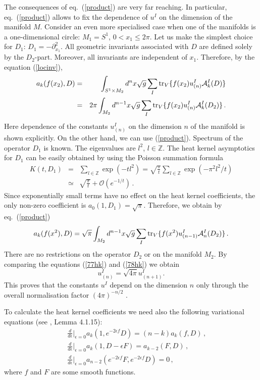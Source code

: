 The consequences of eq.\ (\ref{product})
are very far reaching. In particular, eq.\ (\ref{product}) allows to fix
the dependence of $u^I$ on the dimension of the manifold $M$.
Consider an even more specialised case when
one of the manifolds is a one-dimensional circle:  $M_1=S^1$, $0<x_1\le 2\pi$.
Let us make the simplest choice for $D_1$: 
$D_1=-\partial_{x_1}^2$. All geometric invariants associated with
$D$ are defined solely by the $D_2$-part. Moreover, all invariants are
independent of $x_1$.
Therefore, by the equation (\ref{locinv}),
\begin{eqnarray}
a_k(f(x_2),D)&=&\int_{S^1\times M_2}d^nx\sqrt{g}\sum_I
{\rm tr}_V \{f(x_2) u^I_{(n)} 
\mathcal{ A}^I_k (D) \} \nonumber \\
&=&2\pi\int_{M_2}d^{n-1}x\sqrt{g}\sum_I
{\rm tr}_V \{f(x_2) u^I_{(n)} \mathcal{ A}^I_k (D_2) \}\,.
\label{77hk}
\end{eqnarray}
Here dependence of the constants $u^I_{(n)}$ on the dimension $n$ of
the manifold is shown explicitly.
On the other hand, we can use (\ref{product}). Spectrum
of the operator $D_1$ is known. The eigenvalues are $l^2$,
$l \in {\mathbb {Z}}$. The heat kernel asymptotics for $D_1$
can be easily obtained
by using the Poisson summation formula
\begin{eqnarray}
K(t,D_1)&=&\sum_{l\in \mathbb{Z}} \exp (-tl^2)=\sqrt{\frac {\pi}t}
\sum_{l\in \mathbb{Z}} \exp (-\pi^2 l^2/t) \nonumber\\
&\simeq& \sqrt{\frac {\pi}t} +\mathcal{O}\left( e^{-1/t} \right)\,.
\label{eq:asPoi}
\end{eqnarray}
Since exponentially small terms have no effect on the heat kernel
coefficients, the only non-zero coefficient is
$a_0(1,D_1)=\sqrt{\pi}$. Therefore, we obtain by eq.\ (\ref{product})
\begin{equation}
a_k(f(x^2),D)={\sqrt \pi} \int_{M_2}d^{n-1}x\sqrt{g}\sum_I
{\rm tr}_V
 \{f(x^2) u^I_{(n-1)} \mathcal{ A}^I_n (D_2) \} \,.  
\label{78hk}
\end{equation}
There are no restrictions on the 
operator $D_2$ or on the manifold $M_2$.
By comparing the equations (\ref{77hk}) and (\ref{78hk})
we obtain
\begin{equation}
u^I_{(n)}=\sqrt{4\pi} u^I_{(n+1)}. \label{uIn}
\end{equation}
This proves that the
constants $u^I$ depend on the dimension
$n$ only through the overall normalisation factor
$(4\pi )^{-n/2}$ .

To calculate the heat kernel coefficients we need also
the following variational equations (see \cite{Gilkey:1995},
Lemma 4.1.15):
\begin{eqnarray}
&&\frac{d}{d\epsilon} \vert_{\epsilon =0} a_k
(1, e^{-2\epsilon f} D)=(n-k) a_k (f,D)\,,\label{vara} \\
&&\frac{d}{d\epsilon} \vert_{\epsilon =0} a_k
(1,D-\epsilon F) =a_{k-2}(F,D)\,,\label{varb} \\
&&\frac{d}{d\epsilon} \vert_{\epsilon =0} a_{n-2}
(e^{-2\epsilon f}F,e^{-2\epsilon f} D)=0\,,\label{varc}
\end{eqnarray}
where $f$ and $F$ are some smooth functions.

